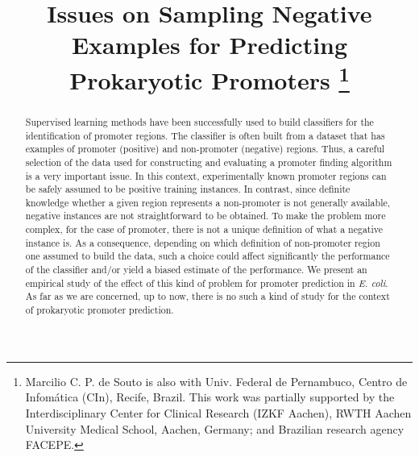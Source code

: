 \documentclass[conference,letterpaper]{IEEEtran}
\begin{document}
\title{Issues on Sampling Negative Examples for Predicting Prokaryotic Promoters
\thanks{Marcilio C. P. de Souto is also with Univ. Federal de Pernambuco, Centro de Infom\'{a}tica (CIn), Recife, Brazil. This work was partially supported by the Interdisciplinary Center for Clinical Research (IZKF Aachen), RWTH Aachen University Medical School, Aachen, Germany; and Brazilian research agency FACEPE.}
}

\author{
\and
{}
}

\maketitle

\begin{abstract}
Supervised learning methods have been successfully used to build classifiers for the identification of promoter regions. The classifier is often built from a dataset that has examples of promoter (positive) and non-promoter (negative) regions. Thus, a careful selection of the data used for constructing and evaluating a promoter finding algorithm is a very important issue. In this context, experimentally known promoter regions can be safely assumed to be positive training instances. In contrast, since definite knowledge whether a given region represents a non-promoter is not generally available, negative instances are not straightforward to be obtained. To make the problem more complex, for the case of promoter, there is not a unique definition of what a negative instance is. As a consequence, depending on which definition of non-promoter region one assumed to build the data, such a choice could affect significantly the performance of the classifier and/or yield a biased estimate of the performance. We present an empirical study of the effect of this kind of problem for promoter prediction in {\it E. coli}. As far as we are concerned, up to now, there is no such a kind of study for the context of prokaryotic promoter prediction.
\end{abstract}
\end{document}
